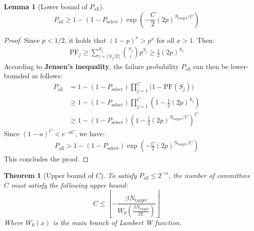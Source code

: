 \documentclass[journal]{IEEEtran}
\newtheorem{theorem}{Theorem}
\newtheorem{lemma}{Lemma}
\begin{document}
\begin{lemma}[Lower bound of $P_{\text{all}}$]
\label{lemma:p_all_lower_bound}
$$P_{\text{all}} \ge 1 - (1 - P_{\text{select}}) \exp\left( -\frac{C}{2} (2p)^{N_{\text{target}} / C} \right)$$
\end{lemma}
\begin{proof}
Since $p < 1/2$, it holds that $(1-p)^x > p^x$ for all $x > 1$. Then:
\begin{align}
\text{PF}_j \ge \sum_{i=\lceil S_j/2 \rceil}^{S_j} \binom{S_j}{i} p^{S_j} 
\ge \frac{1}{2} (2p)^{S_j}
\end{align}
According to \textbf{Jensen's inequality}\cite{jensen1906convexes}, the failure probability $P_{\text{all}}$ can then be lower-bounded as follows:
\begin{align}
P_{\text{all}} &= 1 - (1-P_{\text{select}}) \prod_{j=1}^{C}\Big(1-\text{PF}(S_j)\Big) \nonumber \\
&\ge 1 - (1-P_{\text{select}})\prod_{j=1}^{C} (1 - \frac{1}{2} (2p)^{S_j}) \nonumber \\
&\ge 1 - (1-P_{\text{select}})\left(1 - \frac{1}{2} (2p)^{N_{\text{target}} / C}\right)^C
\end{align}
Since $(1-a)^C<e^{-aC}$, we have:
\begin{align}
P_{\text{all}} > 1 - (1-P_{\text{select}})\exp\left(- \frac{C}{2} (2p)^{N_{\text{target}} / C} \right)
\end{align}
This concludes the proof.
\end{proof}

\begin{theorem}[Upper bound of $C$]
\label{theorem:c-lower-bound}
To satisfy $P_{\text{all}} \le 2^{-\alpha}$, the number of committees $C$ must satisfy the following upper bound:
\begin{equation}
C \le \left\lfloor- \frac{\beta N_{\text{target}}}{W_0\left(\frac{\beta N_{\text{target}}}{2L} \right)}
 \right\rfloor
\end{equation}
Where $W_0(x)$ is the main branch of Lambert W function\cite{Lambert1996Corless}.
\end{theorem}
\end{document}
